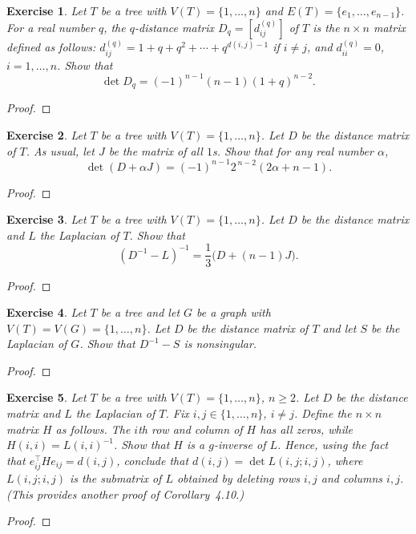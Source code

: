 \documentclass[11pt]{article}
\newtheorem{exercise}{Exercise}[section]
\theoremstyle{definition}
\begin{document}
\begin{exercise}
Let $T$ be a tree with $V(T)=\{1,\ldots,n\}$ and $E(T)=\{e_1,\ldots,e_{n-1}\}$. For a real
number $q$, the $q$-distance matrix $D_q=[d^{(q)}_{ij}]$ of $T$ is the $n\times n$ matrix
defined as follows: $d^{(q)}_{ij}=1+q+q^2+\cdots+q^{d(i,j)-1}$ if $i\ne j$, and
$d^{(q)}_{ii}=0$, $i=1,\ldots,n$. Show that
\[
\det D_q = (-1)^{n-1}(n-1)(1+q)^{n-2}.
\]
\end{exercise}
\begin{proof}
\end{proof}

\begin{exercise}
Let $T$ be a tree with $V(T)=\{1,\ldots,n\}$. Let $D$ be the distance matrix of $T$.
As usual, let $J$ be the matrix of all $1$s. Show that for any real number $\alpha$,
\[
\det(D+\alpha J)=(-1)^{n-1}2^{\,n-2}(2\alpha+n-1).
\]
\end{exercise}
\begin{proof}
\end{proof}

\begin{exercise}
Let $T$ be a tree with $V(T)=\{1,\ldots,n\}$. Let $D$ be the distance matrix and $L$ the
Laplacian of $T$. Show that
\[
(D^{-1}-L)^{-1}=\frac{1}{3}\bigl(D+(n-1)J\bigr).
\]
\end{exercise}
\begin{proof}
\end{proof}

\begin{exercise}
Let $T$ be a tree and let $G$ be a graph with $V(T)=V(G)=\{1,\ldots,n\}$. Let $D$ be the
distance matrix of $T$ and let $S$ be the Laplacian of $G$. Show that $D^{-1}-S$ is nonsingular.
\end{exercise}
\begin{proof}
\end{proof}

\begin{exercise}
Let $T$ be a tree with $V(T)=\{1,\ldots,n\}$, $n\ge 2$. Let $D$ be the distance matrix and
$L$ the Laplacian of $T$. Fix $i,j\in\{1,\ldots,n\}$, $i\ne j$. Define the $n\times n$ matrix
$H$ as follows. The $i$th row and column of $H$ has all zeros, while $H(i,i)=L(i,i)^{-1}$.
Show that $H$ is a $g$-inverse of $L$. Hence, using the fact that
$e_{ij}^\top H e_{ij}=d(i,j)$, conclude that $d(i,j)=\det L(i,j;i,j)$, where $L(i,j;i,j)$ is the
submatrix of $L$ obtained by deleting rows $i,j$ and columns $i,j$.
(This provides another proof of Corollary~4.10.)
\end{exercise}
\begin{proof}
\end{proof}
\end{document}
